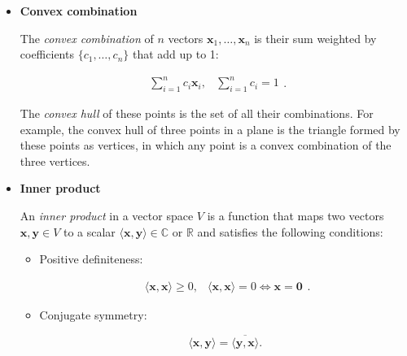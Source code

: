 \documentclass[10pt,b5paper,titlepage]{book}
\begin{document}
\begin{itemize}
    \item \textbf{Convex combination}

        The \textit{convex combination} of $n$ vectors $\mathbf{x}_{1}, \ldots, \mathbf{x}_{n}$
        is their sum weighted by coefficients $\{c_1, \ldots, c_{n}\}$
        that add up to 1:

        \begin{equation}
            \begin{array}{lr}
                \sum_{i=1}^{n} c_{i} \mathbf{x}_{i}, & \sum_{i=1}^{n} c_{i} = 1
            \end{array}
        .\end{equation}

        The \textit{convex hull} of these points is the set of all their combinations.
        For example, the convex hull of three points in a plane is the triangle
        formed by these points as vertices, in which any point is a convex
        combination of the three vertices.

    \item \textbf{Inner product}

        An \textit{inner product} in a vector space $V$ is a function that maps
        two vectors $\mathbf{x}, \mathbf{y} \in V$ to a scalar
        $\langle \mathbf{x}, \mathbf{y} \rangle \in \mathbb{C}$ or $\mathbb{R}$
        and satisfies the following conditions:

        \begin{itemize}
            \item Positive definiteness:

                \begin{equation}
                    \begin{array}{lr}
                        \langle \mathbf{x}, \mathbf{x} \rangle \ge 0, &
                        \langle \mathbf{x}, \mathbf{x} \rangle = 0 \iff \mathbf{x} = \mathbf{0}
                    \end{array}
                .\end{equation}

            \item Conjugate symmetry:

                \begin{equation}
                    \langle \mathbf{x}, \mathbf{y} \rangle
                    = \overline{\langle \mathbf{y}, \mathbf{x} \rangle}
                .\end{equation}


\end{itemize}
\end{itemize}
\end{document}
